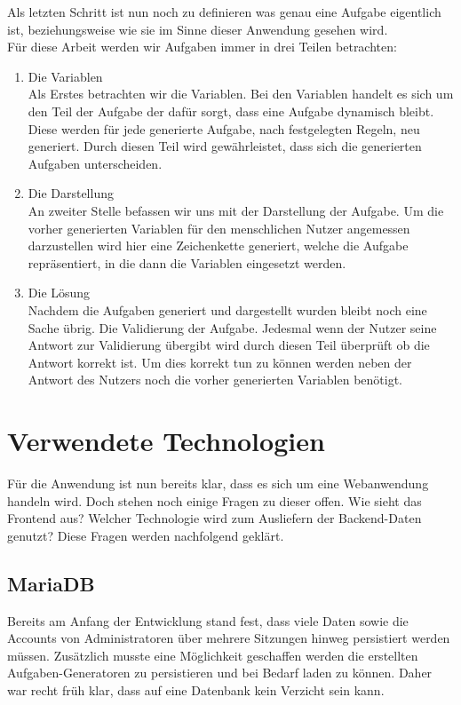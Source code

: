 Als letzten Schritt ist nun noch zu definieren was genau eine Aufgabe eigentlich ist, beziehungsweise wie sie im Sinne dieser Anwendung gesehen wird. \\
Für diese Arbeit werden wir Aufgaben immer in drei Teilen betrachten:
\begin{enumerate}
\item Die Variablen \\
Als Erstes betrachten wir die Variablen. Bei den Variablen handelt es sich um den Teil der Aufgabe der dafür sorgt, dass eine Aufgabe dynamisch bleibt. Diese werden für jede generierte Aufgabe, nach festgelegten Regeln, neu generiert. Durch diesen Teil wird gewährleistet, dass sich die generierten Aufgaben unterscheiden.
\item Die Darstellung \\
An zweiter Stelle befassen wir uns mit der Darstellung der Aufgabe. Um die vorher generierten Variablen für den menschlichen Nutzer angemessen darzustellen wird hier eine Zeichenkette generiert, welche die Aufgabe repräsentiert, in die dann die Variablen eingesetzt werden.
\item Die Lösung \\
Nachdem die Aufgaben generiert und dargestellt wurden bleibt noch eine Sache übrig. Die Validierung der Aufgabe. Jedesmal wenn der Nutzer seine Antwort zur Validierung übergibt wird durch diesen Teil überprüft ob die Antwort korrekt ist. Um dies korrekt tun zu können werden neben der Antwort des Nutzers noch die vorher generierten Variablen benötigt.
\end{enumerate}

\section{Verwendete Technologien}

Für die Anwendung ist nun bereits klar, dass es sich um eine Webanwendung handeln wird. Doch stehen noch einige Fragen zu dieser offen. Wie sieht das Frontend aus? Welcher Technologie wird zum Ausliefern der Backend-Daten genutzt? Diese Fragen werden nachfolgend geklärt.


\subsection{MariaDB}


Bereits am Anfang der Entwicklung stand fest, dass viele Daten sowie die Accounts von Administratoren über mehrere Sitzungen hinweg persistiert werden müssen. Zusätzlich musste eine Möglichkeit geschaffen werden die erstellten Aufgaben-Generatoren zu persistieren und bei Bedarf laden zu können. Daher war recht früh klar, dass auf eine Datenbank kein Verzicht sein kann. \\

